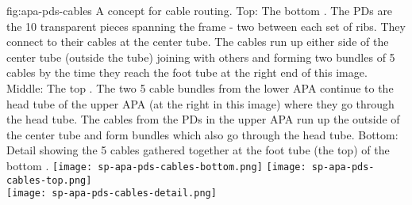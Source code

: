 \begin{dunefigure}{fig:apa-pds-cables}
{%
A concept for  cable routing. Top: The bottom .  The PDs are the 10 transparent pieces spanning the frame - two between each set of ribs.  They connect to their cables at the center tube.  The cables run up either side of the center tube (outside the tube) joining with others and forming two bundles of 5 cables by the time they reach the foot tube at the right end of this image. Middle: The top . The two 5 cable bundles from the lower APA continue to the head tube of the upper APA (at the right in this image) where they go through the head tube.  The cables from the PDs in the upper APA run up the outside of the center tube and form bundles which also go through the head tube. Bottom: Detail showing the 5  cables gathered together at the foot tube (the top) of the bottom .}
\texttt{[image: sp-apa-pds-cables-bottom.png]}
\hspace*{4mm}\texttt{[image: sp-apa-pds-cables-top.png]}
\vspace{5mm} \\
\hspace*{-10mm}\texttt{[image: sp-apa-pds-cables-detail.png]}
\end{dunefigure}





